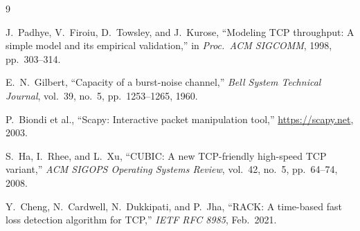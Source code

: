 \documentclass[11pt,letterpaper]{article}
\begin{document}
\begin{thebibliography}{9}

J.~Padhye, V.~Firoiu, D.~Towsley, and J.~Kurose,
``Modeling TCP throughput: A simple model and its empirical validation,''
in \emph{Proc.\ ACM SIGCOMM}, 1998, pp.~303--314.

E.~N.~Gilbert,
``Capacity of a burst-noise channel,''
\emph{Bell System Technical Journal}, vol.~39, no.~5, pp.~1253--1265, 1960.

P.~Biondi et al., ``Scapy: Interactive packet manipulation tool,''
\url{https://scapy.net}, 2003.

S.~Ha, I.~Rhee, and L.~Xu,
``CUBIC: A new TCP-friendly high-speed TCP variant,''
\emph{ACM SIGOPS Operating Systems Review}, vol.~42, no.~5, pp.~64--74, 2008.

Y.~Cheng, N.~Cardwell, N.~Dukkipati, and P.~Jha,
``RACK: A time-based fast loss detection algorithm for TCP,''
\emph{IETF RFC 8985}, Feb.\ 2021.

\end{thebibliography}
\end{document}
